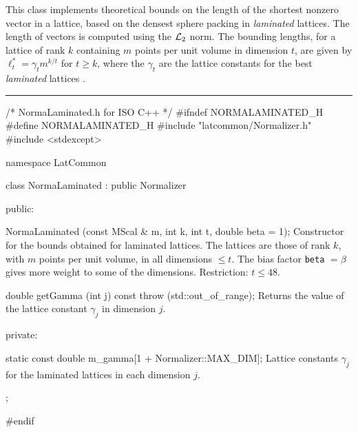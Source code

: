 % 
% 
% 
% 


 This class implements theoretical bounds on the length of the shortest
 nonzero vector in a lattice, based on the densest sphere packing in 
 {\em laminated} lattices. The length of vectors is computed using the
 ${\cal L}_2$ norm. The bounding lengths, for a lattice of rank $k$ 
 containing $m$ points per unit volume in dimension $t$, are given by
 $\ell_t^* = \gamma_t m^{k/t}$ for $t \ge k$, where the $\gamma_t$ are
 the lattice constants for the best {\em laminated} lattices \cite{mCON99a}.


\bigskip\hrule
\code \hide
/* NormaLaminated.h for ISO C++ */
#ifndef NORMALAMINATED_H
#define NORMALAMINATED_H
\endhide
#include "latcommon/Normalizer.h"
#include <stdexcept>


namespace LatCommon {

class NormaLaminated : public Normalizer {
public:

   NormaLaminated (const MScal & m, int k, int t, double beta = 1);
\endcode
 \tabb Constructor for the bounds obtained for laminated lattices. The 
   lattices are those of rank $k$,
   with $m$ points per unit volume, in all dimensions  $\le t$.
   The bias factor \texttt{beta} $= \beta$ gives more weight to some of the
   dimensions. %
   Restriction: $t \le 48$.
  \endtabb
\code

   double getGamma (int j) const throw (std::out_of_range);
\endcode
 \tabb 
   Returns the value of the lattice constant $\gamma_j$ in dimension  $j$.
 \endtabb
\ifdetailed
\code


private:

   static const double m_gamma[1 + Normalizer::MAX_DIM];
\endcode
 \tabb 
  Lattice constants $\gamma_j$ for the laminated lattices in each
  dimension $j$.
  \endtabb
\fi
\code

};

}

\hide
#endif
\endhide
\endcode
